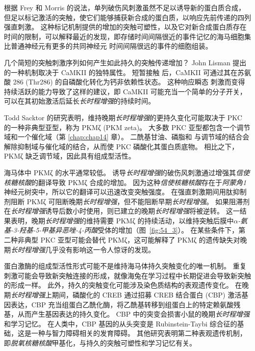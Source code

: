 根据 Frey 和 Morris 的说法，单列破伤风刺激虽然不足以诱导新的蛋白质合成，但足以标记激活的突触，使它们能够捕获新合成的蛋白质，以响应先前传递的四列 强直刺激。
这种标记机制提供的增加的突触可塑性，以及它对新合成蛋白质存在时间的限制，可以解释最近的发现，即存储时间间隔很近的事件记忆的海马细胞集比普通神经元有更多的共同神经元 时间间隔很远的事件的细胞组装。


几个简短的突触刺激序列如何产生如此持久的突触传递增加？
John Lisman 提出的一种机制取决于 CaMKII 的独特属性。
短暂接触  后，CaMKII 可通过其在苏氨酸 286 (Thr286) 的自磷酸化转化为钙非依赖性状态。
这种响应瞬态  刺激而变得持续活跃的能力导致了这样的建议，即 CaMKII 可能充当一个简单的分子开关，可以在其初始激活后延长\textit{长时程增强}的持续时间。


Todd Sacktor 的研究表明，维持晚期\textit{长时程增强}的更持久变化可能取决于 PKC 的一种非典型亚型，称为 PKMζ (PKM zeta)。
大多数 PKC 亚型都包含一个调节域和一个催化域（第 \ref{chap:chap14} 章）。
二酰基甘油、磷脂和  与调节域的结合会解除抑制域与催化域的结合，从而使 PKC 磷酸化其蛋白质底物。
相比之下，PKMζ 缺乏调节域，因此具有组成型活性。


海马体中 PKMζ 的水平通常较低。
诱导\textit{长时程增强}的破伤风刺激通过增强其\textit{信使核糖核酸}的翻译导致 PKMζ 合成的增加。
因为这种\textit{信使核糖核酸}存在于\textit{阿蒙角1}神经元树突中，所以它的翻译可以迅速改变突触强度。
在强直刺激期间用肽抑制剂阻断 PKMζ 可阻断晚期\textit{长时程增强}，但不能阻断早期\textit{长时程增强}。
如果阻滞剂在\textit{长时程增强}诱导后数小时使用，则已建立的晚期\textit{长时程增强}将被逆转。
这一结果表明，晚期\textit{长时程增强}的维持需要 PKMζ 的持续活动，以维持突触后膜中\textit{$\alpha$-氨基-3-羟基-5-甲基异恶唑-4-丙酸}受体的增加（图~\ref{fig:54_3}）。
在某些条件下，第二种非典型 PKC 亚型可能会替代 PKMζ，这可能解释了 PKMζ 的遗传缺失对晚期\textit{长时程增强}几乎没有影响这一令人惊讶的发现。


蛋白激酶的组成型活性形式可能不是维持海马体持久突触变化的唯一机制。
重复刺激可能会导致新突触连接的形成，就像海兔在学习过程中长期促进会导致新突触的形成一样。
此外，持久的突触变化可能涉及染色质结构的表观遗传变化。
在晚期\textit{长时程增强}上期间，磷酸化的 CREB 通过招募 CREB 结合蛋白 (CBP) 激活基因表达，CBP 充当组蛋白乙酰化酶，将乙酰基转移到组蛋白上的特定赖氨酸残基，从而产生基因表达的持久变化。
CBP 中的突变会损害小鼠的晚期\textit{长时程增强}和学习记忆。
在人类中，CBP 基因的从头突变是 Rubinstein-Taybi 综合征的基础，这是一种与智力障碍相关的发育障碍。
其他研究表明第二种表观遗传机制，即\textit{脱氧核糖核酸}甲基化，与持久的突触可塑性和学习记忆有关。



